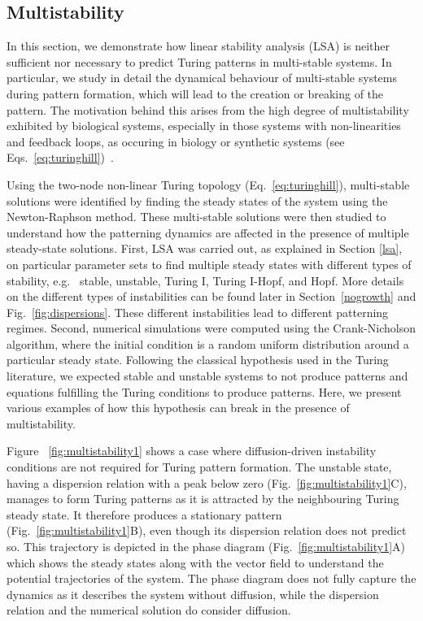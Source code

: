 \subsection{Multistability}

In this section, we demonstrate how linear stability analysis (LSA) is neither sufficient nor necessary to predict Turing patterns in multi-stable systems.
In particular, we study in detail the dynamical behaviour of multi-stable systems during pattern formation, which will lead to the creation or breaking of the pattern.
The motivation behind this arises from the high degree of multistability exhibited by biological systems, especially in those systems with non-linearities and feedback loops, as occuring in biology or synthetic systems (see Eqs.~\ref{eq:turinghill})~\parencite{pham2020complexity, leite2009multistability}.

Using the two-node non-linear Turing topology (Eq.~\ref{eq:turinghill}), multi-stable solutions were identified by finding the steady states of the system using the Newton-Raphson method. These multi-stable solutions were then studied to understand how the patterning dynamics are affected in the presence of multiple steady-state solutions.
First, LSA was carried out, as explained in Section \ref{lsa}, on particular parameter sets to find multiple steady states with different types of stability, e.g. ~stable, unstable, Turing I, Turing I-Hopf, and Hopf. More details on the different types of instabilities can be found later in Section~\ref{nogrowth} and Fig.~\ref{fig:dispersions}. These different instabilities lead to different patterning regimes.
Second, numerical simulations were computed using the Crank-Nicholson algorithm, where the initial condition is a random uniform distribution around a particular steady state.
Following the classical hypothesis used in the Turing literature, we expected stable and unstable systems to not produce patterns and equations fulfilling the Turing conditions to produce patterns.
Here, we present various examples of how this hypothesis can break in the presence of multistability.

Figure ~\ref{fig:multistability1} shows a case where diffusion-driven instability conditions are not required for Turing pattern formation.
The unstable state, having a dispersion relation with a peak below zero (Fig.~\ref{fig:multistability1}C), manages to form Turing patterns as it is attracted by the neighbouring Turing steady state.
It therefore produces a stationary pattern (Fig.~\ref{fig:multistability1}B), even though its dispersion relation does not predict so.
This trajectory is depicted in the phase diagram (Fig.~\ref{fig:multistability1}A) which shows the steady states along with the vector field to understand the potential trajectories of the system.
The phase diagram does not fully capture the dynamics as it describes the system without diffusion, while the dispersion relation and the numerical solution do consider diffusion.

